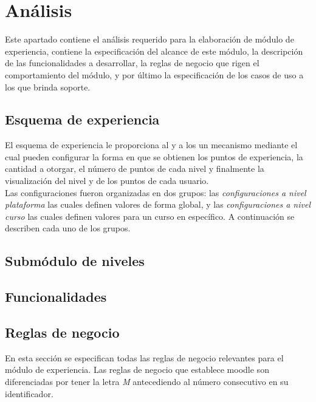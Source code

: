 
\chapter{Análisis}

 Este apartado contiene el análisis requerido para la elaboración de módulo de experiencia,
 contiene la especificación del alcance de este módulo, la descripción de las funcionalidades
 a desarrollar, la reglas de negocio que rigen el comportamiento del módulo, y por último la
 especificación de los casos de uso a los que brinda soporte.

\section{Esquema de experiencia}

 El esquema de experiencia le proporciona al  y a los  un mecanismo mediante el cual pueden configurar la forma en que se obtienen los puntos
 de experiencia, la cantidad a otorgar, el número de puntos de cada nivel y finalmente la
 visualización del nivel y de los puntos de cada usuario.\\

 \noindent
 Las configuraciones fueron organizadas en dos grupos: las {\it configuraciones a
 nivel plataforma} las cuales definen valores de forma global, y las {\it configuraciones a nivel
 curso} las cuales definen valores para un curso en específico. A continuación se describen cada
 uno de los grupos.\\

\section{Submódulo de niveles}

\section{Funcionalidades}

\section{Reglas de negocio}

 En esta sección se especifican todas las reglas de negocio relevantes para el módulo de
 experiencia. Las reglas de negocio que establece moodle son diferenciadas por tener la letra {\it M}
 antecediendo al número consecutivo en su identificador.


